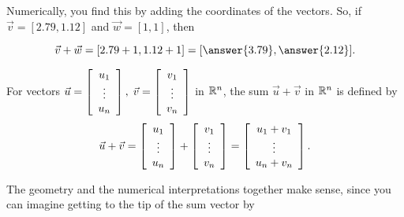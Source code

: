 \documentclass{ximera}
\begin{document}
Numerically, you find this by adding the coordinates of the vectors. So, if $\vec{v}=[2.79,1.12]$ and $\vec{w}=[1,1]$, then 

\[
\vec{v}+\vec{w}=[2.79+1,1.12+1]=[\answer{3.79},\answer{2.12}].
\]

\begin{definition}
  For vectors $\vec{u}=\startmat{c}
    u_1 \\
    \vdots \\
    u_n
  \stopmat,\; \vec{v}= \startmat{c}
    v_1 \\
    \vdots \\
    v_n
  \stopmat$ in $\R^n$, the sum $\vec{u}+\vec{v}$ in $\R^n$ is defined
  by
  \begin{equation*}
    \vec{u}+\vec{v} = \startmat{c}
      u_1 \\
      \vdots \\
      u_n
    \stopmat +  \startmat{c}
      v_1 \\
      \vdots \\
      v_n
    \stopmat
    = \startmat{c}
      u_1+v_1 \\
      \vdots \\
      u_n+v_n
    \stopmat.
  \end{equation*}
\end{definition}

The geometry and the numerical interpretations together make sense, since you can imagine getting to the tip of the sum vector by 
\end{document}
